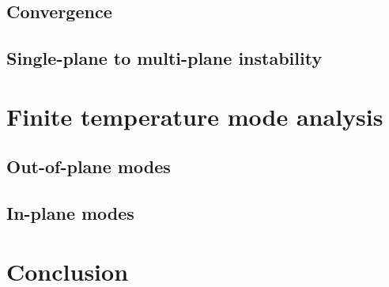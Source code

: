 \documentclass[aps, pra, preprint]{revtex4-1}
\begin{document}
\subsection{Convergence}

\subsection{Single-plane to multi-plane instability}


\section{Finite temperature mode analysis}

\subsection{Out-of-plane modes}

\subsection{In-plane modes}



\section{Conclusion}


\end{document}
